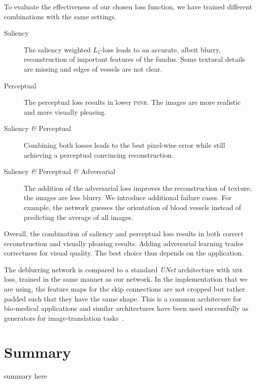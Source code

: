 \documentclass{scrartcl}
\begin{document}
To evaluate the effectiveness of our chosen loss function, we have trained different combinations with the same settings.
\begin{description}
\item[Saliency] The saliency weighted $L_1$-loss leads to an accurate, albeit blurry, reconstruction of important features of the fundus.
  Some textural details are missing and edges of vessels are not clear.
\item[Perceptual] The perceptual loss results in lower \textsc{psnr}.
  The images are more realistic and more visually pleasing.
\item[Saliency \textit{\&} Perceptual] Combining both losses leads to the best pixel-wise error while still achieving a perceptual convincing reconstruction.
\item[Saliency \textit{\&} Perceptual \textit{\&} Adversarial]
  The addition of the adversarial loss improves the reconstruction of texture, the images are less blurry.
  We introduce additional failure cases.
  For example, the network guesses the orientation of blood vessels instead of predicting the average of all images.
\end{description}
Overall, the combination of saliency and perceptual loss results in both correct reconstruction and visually pleasing results.
Adding adversarial learning trades correctness for visual quality.
The best choice thus depends on the application.

The deblurring network is compared to a standard \textit{UNet} architecture with \textsc{mse} loss, trained in the same manner as our network.
In the implementation that we are using, the feature maps for the skip connections are not cropped but rather padded such that they have the same shape.
This is a common architecure for bio-medical applications and similar architectures have been used successfully as generators for image-translation tasks~\cite{PatchGAN}.




\section{Summary}
summary here

\printbibliography
\end{document}
